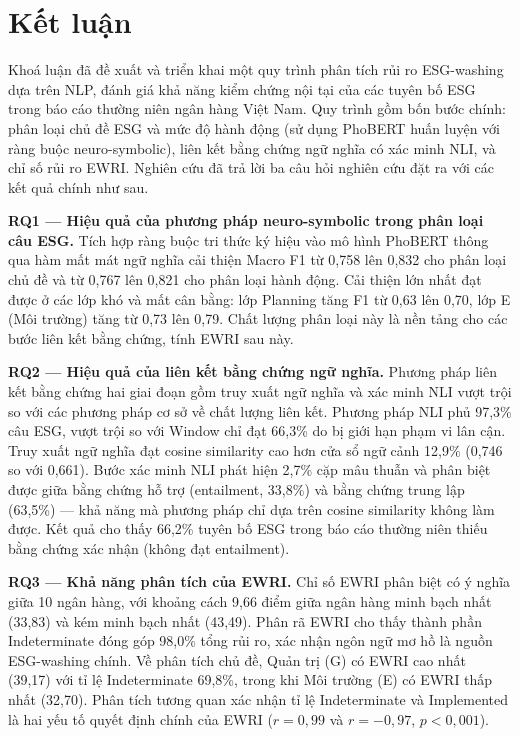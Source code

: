 \chapter*{Kết luận}

Khoá luận đã đề xuất và triển khai một quy trình phân tích rủi ro ESG-washing dựa trên NLP, đánh giá khả năng kiểm chứng nội tại của các tuyên bố ESG trong báo cáo thường niên ngân hàng Việt Nam. Quy trình gồm bốn bước chính: phân loại chủ đề ESG và mức độ hành động (sử dụng PhoBERT huấn luyện với ràng buộc neuro-symbolic), liên kết bằng chứng ngữ nghĩa có xác minh NLI, và chỉ số rủi ro EWRI. Nghiên cứu đã trả lời ba câu hỏi nghiên cứu đặt ra với các kết quả chính như sau.

\textbf{RQ1 --- Hiệu quả của phương pháp neuro-symbolic trong phân loại câu ESG.} Tích hợp ràng buộc tri thức ký hiệu vào mô hình PhoBERT thông qua hàm mất mát ngữ nghĩa cải thiện Macro F1 từ 0,758 lên 0,832 cho phân loại chủ đề và từ 0,767 lên 0,821 cho phân loại hành động. Cải thiện lớn nhất đạt được ở các lớp khó và mất cân bằng: lớp Planning tăng F1 từ 0,63 lên 0,70, lớp E (Môi trường) tăng từ 0,73 lên 0,79. Chất lượng phân loại này là nền tảng cho các bước liên kết bằng chứng, tính EWRI sau này.

\textbf{RQ2 --- Hiệu quả của liên kết bằng chứng ngữ nghĩa.} Phương pháp liên kết bằng chứng hai giai đoạn gồm truy xuất ngữ nghĩa và xác minh NLI vượt trội so với các phương pháp cơ sở về chất lượng liên kết. Phương pháp NLI phủ 97,3\% câu ESG, vượt trội so với Window chỉ đạt 66,3\% do bị giới hạn phạm vi lân cận. Truy xuất ngữ nghĩa đạt cosine similarity cao hơn cửa sổ ngữ cảnh 12,9\% (0,746 so với 0,661). Bước xác minh NLI phát hiện 2,7\% cặp mâu thuẫn và phân biệt được giữa bằng chứng hỗ trợ (entailment, 33,8\%) và bằng chứng trung lập (63,5\%) --- khả năng mà phương pháp chỉ dựa trên cosine similarity không làm được. Kết quả cho thấy 66,2\% tuyên bố ESG trong báo cáo thường niên thiếu bằng chứng xác nhận (không đạt entailment).

\textbf{RQ3 --- Khả năng phân tích của EWRI.} Chỉ số EWRI phân biệt có ý nghĩa giữa 10 ngân hàng, với khoảng cách 9,66 điểm giữa ngân hàng minh bạch nhất (33,83) và kém minh bạch nhất (43,49). Phân rã EWRI cho thấy thành phần Indeterminate đóng góp 98,0\% tổng rủi ro, xác nhận ngôn ngữ mơ hồ là nguồn ESG-washing chính. Về phân tích chủ đề, Quản trị (G) có EWRI cao nhất (39,17) với tỉ lệ Indeterminate 69,8\%, trong khi Môi trường (E) có EWRI thấp nhất (32,70). Phân tích tương quan xác nhận tỉ lệ Indeterminate và Implemented là hai yếu tố quyết định chính của EWRI ($r = 0{,}99$ và $r = -0{,}97$, $p < 0{,}001$).

